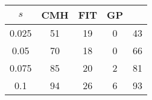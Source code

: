 \centering \begin{tabular}{c|c|c|c|c}
$s$	&CMH	&FIT	&GP	&\sc{Clear}\\\hline
0.025	&51	&19	&0	&43\\
0.05	&70	&18	&0	&66\\
0.075	&85	&20	&2	&81\\
0.1	&94	&26	&6	&93\\
\end{tabular}
